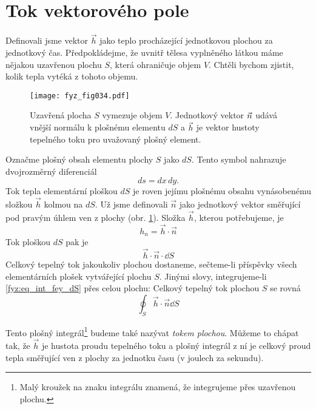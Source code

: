   \section{Tok vektorového pole}\label{fyz:IIchapIIIsecII}
    Definovali jsme vektor $\vec{h}$ jako teplo procházející jednotkovou plochou za jednotkový čas.
    Předpokládejme, že uvnitř tělesa vyplněného látkou máme nějakou uzavřenou plochu \(S\), která 
    ohraničuje objem \(V\). Chtěli bychom zjistit, kolik tepla vytéká z tohoto objemu.

    \begin{figure}[ht!]  %
      \centering
      \texttt{[image: fyz\_fig034.pdf]}
      \caption{Uzavřená plocha $S$ vymezuje objem $V$. Jednotkový vektor $\protect\vec{n}$ udává 
        vnější normálu k plošnému elementu $dS$ a $\protect\vec{h}$ je vektor hustoty 
        tepelného toku pro uvažovaný plošný element.}
      \label{fyz:fig034}
    \end{figure}
    Označme plošný obsah elementu plochy \(S\) jako \(dS\). Tento symbol nahrazuje dvojrozměrný
    diferenciál
    \begin{equation}
      ds=dx\,dy.
    \end{equation}
    Tok tepla elementární ploškou \(dS\) je roven jejímu plošnému obsahu  vynásobenému složkou 
    $\vec{h}$ kolmou na \(dS\). Už jsme definovali $\vec{n}$ jako jednotkový vektor směřující pod 
    pravým úhlem ven z plochy (obr. \ref{fyz:fig034}). Složka $\vec{h}$, kterou potřebujeme, je
    \begin{equation}
      h_n = \vec{h}\cdot\vec{n}
    \end{equation}
    Tok ploškou $dS$ pak je
    \begin{equation}\label{fyz:eq_int_fey_dS}
      \vec{h}\cdot\vec{n}\cdot\dd{S}
    \end{equation}
    Celkový tepelný tok jakoukoliv plochou dostaneme, sečteme-li příspěvky všech elementárních 
    plošek vytvářející plochu \(S\). Jinými slovy, integrujeme-li \ref{fyz:eq_int_fey_dS} přes 
    celou plochu: Celkový tepelný tok plochou \(S\) se rovná
    \begin{equation}
      \oint_S\vec{h}\cdot\vec{n}\dd{S}
    \end{equation}

    Tento plošný integrál\footnote{Malý kroužek na znaku integrálu znamená, že integrujeme přes 
    uzavřenou plochu.} budeme také nazývat \emph{tokem plochou}. Můžeme to chápat tak, že $\vec{h}$ 
    je hustota proudu tepelného toku a plošný integrál z ní je celkový proud tepla směřující ven z 
    plochy za jednotku času (v joulech za sekundu).
    

